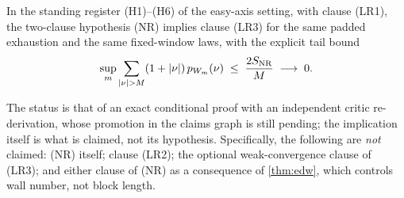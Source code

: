 \begin{theorem}
\label{thm:nr-transfer}
\statusSketch\;
In the standing register (H1)--(H6) of the easy-axis setting, with clause
(LR1), the two-clause hypothesis (NR) implies clause (LR3) for the same padded
exhaustion and the same fixed-window laws, with the explicit tail bound
\begin{equation}
  \sup_m\sum_{\lvert \nu\rvert>M}(1+\lvert \nu\rvert)\,p_{W_m}(\nu)
  \;\le\;\frac{2S_{\mathrm{NR}}}{M}\;\longrightarrow\;0 .
  \label{eq:nr-tail-bound}
\end{equation}
\end{theorem}

\begin{scope}
\label{scope:nr-transfer}
The status is that of an exact conditional proof with an independent critic
re-derivation, whose promotion in the claims graph is still pending; the
implication itself is what is claimed, not its hypothesis. Specifically, the
following are \emph{not} claimed: (NR) itself; clause (LR2); the optional
weak-convergence clause of (LR3); and either clause of (NR) as a consequence of
\cref{thm:edw}, which controls wall number, not block length.
\end{scope}

